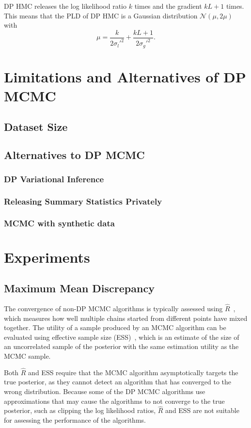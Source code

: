 \documentclass[english,twoside,openright]{HYgraduMLDS}
\newcommand{\caln}{{\mathcal{N}}}
\begin{document}
DP HMC releases the log likelihood ratio \(k\) times and the gradient
\(kL + 1\) times. This means that the PLD of DP HMC is a Gaussian distribution
\(\caln(\mu, 2\mu)\) with
\[
  \mu = \frac{k}{2\sigma_{l}'^{2}} + \frac{kL + 1}{2\sigma_{g}'^{2}}.
\]

\chapter{Limitations and Alternatives of DP MCMC}

\section{Dataset Size}

\section{Alternatives to DP MCMC}

\subsection{DP Variational Inference}
\subsection{Releasing Summary Statistics Privately}
\subsection{MCMC with synthetic data}

\chapter{Experiments}

\section{Maximum Mean Discrepancy}

The convergence of non-DP MCMC algorithms is typically assessed using 
\(\hat{R}\)~\cite{BDA}, which measures how well multiple chains started from 
different points have mixed together. The utility of a sample produced by an 
MCMC algorithm can be evaluated using effective sample size (ESS)~\cite{BDA},
which is an estimate of the size of an uncorrelated sample of the posterior
with the same estimation utility as the MCMC sample. 

Both \(\hat{R}\) and ESS require that the MCMC algorithm asymptotically targets 
the true posterior, as they cannot detect an algorithm that has converged to the 
wrong distribution. Because some of the DP MCMC algorithms use approximations 
that may cause the algorithms to not converge to the true posterior, 
such as clipping the log likelihood ratios, \(\hat{R}\) and ESS are not suitable 
for assessing the performance of the algorithms.
\end{document}

